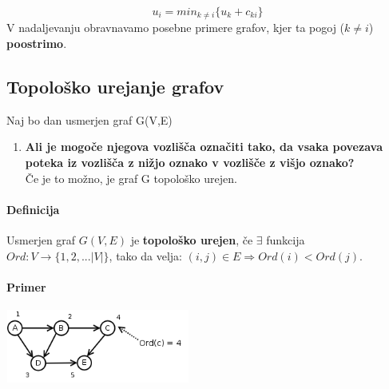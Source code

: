 \documentclass[a4paper,10pt]{article}
\begin{document}
\begin{equation}
u_i = min_{k \neq i} \lbrace u_k + c_{ki} \rbrace
\end{equation}
V nadaljevanju obravnavamo posebne primere grafov, kjer ta pogoj ($k \neq i$) \textbf{poostrimo}.

\subsection{Topolo\v sko urejanje grafov}

Naj bo dan usmerjen graf G(V,E)

\begin{enumerate}
\item \textbf{Ali je mogo\v ce njegova vozli\v s\v ca ozna\v citi tako, da vsaka povezava poteka iz vozli\v s\v ca z ni\v zjo oznako v vozli\v s\v ce z vi\v sjo oznako?} \\
\v Ce je to mo\v zno, je graf G topolo\v sko urejen.
\end{enumerate}

\paragraph{Definicija}
Usmerjen graf $G(V,E)$ je \textbf{topolo\v sko urejen}, \v ce $\exists$ funkcija $Ord: V \rightarrow \lbrace 1, 2,... \vert V \vert \rbrace$, tako da velja: $(i,j) \in E \Rightarrow Ord(i) < Ord(j)$.

\paragraph{Primer}
	\begin{center}
	\includegraphics[width=6.05cm,height=2.4cm]{Slike/NajcenejsePoti4.png}
	\end{center}
\end{document}
